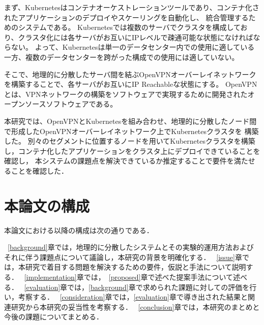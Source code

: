 まず、Kubernetesはコンテナオーケストレーションツールであり、コンテナ化されたアプリケーションのデプロイやスケーリングを自動化し、
統合管理するためのシステムである。
Kubernetesでは複数のサーバでクラスタを構成しており、クラスタ化には各サーバがお互いにIPレベルで疎通可能な状態になければならない。
よって、Kubernetesは単一のデータセンター内での使用に適している一方、複数のデータセンターを跨がった構成での使用には適していない。

そこで、地理的に分散したサーバ間を結ぶOpenVPNオーバーレイネットワークを構築することで、各サーバがお互いにIP Reachableな状態にする。
OpenVPNとは、VPNネットワークの構築をソフトウェアで実現するために開発されたオープンソースソフトウェアである。

本研究では、OpenVPNとKubernetesを組み合わせ、地理的に分散したノード間で形成したOpenVPNオーバーレイネットワーク上でKubernetesクラスタを
構築した。
別々のセグメントに位置するノードを用いてKubernetesクラスタを構築し，コンテナ化したアプリケーションをクラスタ上にデプロイできていることを確認し，
本システムの課題点を解決できているか推定することで要件を満たせることを確認した．

\section{本論文の構成}
\label{introduction:structure}

本論文における以降の構成は次の通りである．

~\ref{background}章では，地理的に分散したシステムとその実験的運用方法およびそれに伴う課題点について議論し，本研究の背景を明確化する．
~\ref{issue}章では，本研究で着目する問題を解決するための要件，仮説と手法について説明する．
~\ref{implementation}章では，~\ref{proposed}章で述べた提案手法について述べる．
~\ref{evaluation}章では，\ref{background}章で求められた課題に対しての評価を行い，考察する．
~\ref{consideration}章では，\ref{evaluation}章で導き出された結果と関連研究から本研究の妥当性を考察する．
~\ref{conclusion}章では，本研究のまとめと今後の課題についてまとめる．

